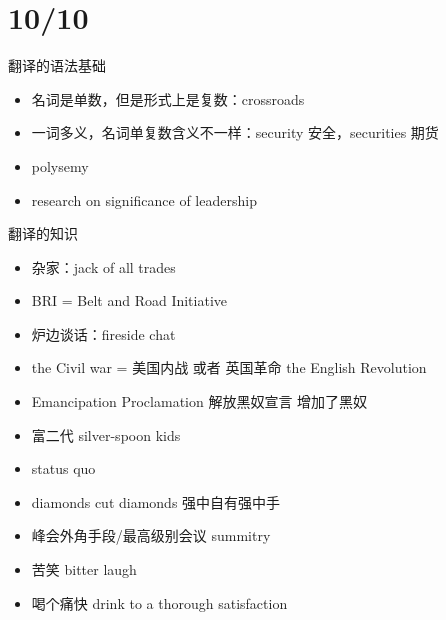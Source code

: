 \documentclass{ctexart}
\begin{document}
\section{10/10}
翻译的语法基础
\begin{itemize}
  \item 名词是单数，但是形式上是复数：crossroads
  \item 一词多义，名词单复数含义不一样：security 安全，securities 期货
  \item polysemy
  \item research on significance of leadership
\end{itemize}
翻译的知识
\begin{itemize}
  \item 杂家：jack of all trades
  \item BRI = Belt and Road Initiative
  \item 炉边谈话：fireside chat
  \item the Civil war = 美国内战 或者 英国革命 the English Revolution
  \item Emancipation Proclamation 解放黑奴宣言 增加了黑奴
  \item 富二代 silver-spoon kids
  \item status quo
  \item diamonds cut diamonds 强中自有强中手
  \item 峰会外角手段/最高级别会议 summitry
  \item 苦笑 bitter laugh
  \item 喝个痛快 drink to a thorough satisfaction
\end{itemize}
\end{document}
